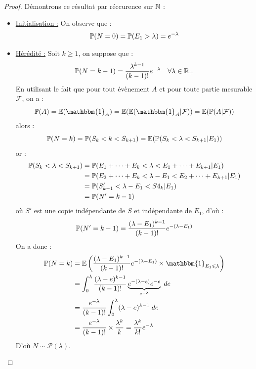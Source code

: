 \begin{proof}
    Démontrons ce résultat par réccurence sur $\mathbb{N}$ : 
    \begin{itemize}
        \item \underline{Initialisation :} On observe que : 
            $$ \mathbb{P}(N = 0) = \mathbb{P}(E_1 > \lambda) = e^{- \lambda} $$ 
        \item \underline{Hérédité :} Soit $ k \geqslant 1 $, on suppose que : 
            $$ \mathbb{P}(N = k-1) = \frac{ \lambda ^{k-1}}{(k-1)!} e^{- \lambda} \quad \forall \lambda \in \mathbb{R}_+ $$ 
        En utilisant le fait que pour tout évènement $A$ et pour toute partie mesurable $ \mathcal{F}$, on a : 
            $$ \myP(A) = \mathbb{E}(\mathbbm{1}_{A}) = \mathbb{E}(\mathbb{E}(\mathbbm{1}_{A} | \mathcal{F})) = \mathbb{E}(\myP(A | \mathcal{F})) $$ 
        alors : 
            $$ \mathbb{P}(N = k) = \mathbb{P}(S_k < k < S_{k+1}) = \mathbb{E}( \mathbb{P}(S_k < \lambda < S_{k+1} | E_1) ) $$ 
        or : 
            \begin{align*}
                \mathbb{P}(S_k < \lambda < S_{k+1}) &= \mathbb{P}(E_1 + \dots + E_k < \lambda < E_1 + \dots + E_{k+1} | E_1) \\
                &= \mathbb{P}(E_2 + \dots + E_k < \lambda  - E_1 < E_2 + \dots + E_{k+1} | E_1) \\ 
                &= \mathbb{P}(S'_{k-1} < \lambda - E_1 < S4_k | E_1) \\
                &= \mathbb{P}(N' = k-1) 
            \end{align*} 
        où $S'$ est une copie indépendante de $S$ et indépendante de $E_1$, d'où : 
            $$ \mathbb{P}(N' = {k-1}) = \frac{( \lambda - E_1)^{k-1}}{(k-1)!} e^{-( \lambda - E_1)} $$  
        On a donc : 
            \begin{align*}
                \myP(N = k) &= \mathbb{E} \left( \frac{( \lambda - E_1)^{k-1}}{(k-1)!} e^{-( \lambda - E_1)} \times \mathbbm{1}_{E_1 \leqslant \lambda}    \right) \\ 
                &= \int_{0}^{ \lambda} \frac{( \lambda - e)^{k-1}}{(k-1)!} \underbrace{e^{-( \lambda - e)} e^{-e}}_{e^{- \lambda}} \; de \\ 
                &= \frac{e^{- \lambda}}{(k-1)!} \int_{0}^{ \lambda} ( \lambda - e)^{k-1} \; de \\ 
                &= \frac{e^{- \lambda}}{(k-1)!} \times \frac{ \lambda^k}{k} = \frac{ \lambda^k}{k!}  e^{- \lambda}  
            \end{align*}
        D'où $N \sim \mathcal{P}( \lambda)$.  
    \end{itemize}
\end{proof}

